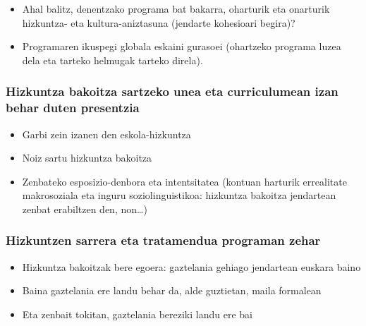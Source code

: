 \documentclass[
]{book}
\providecommand{\tightlist}{%
  \setlength{\itemsep}{0pt}\setlength{\parskip}{0pt}}
\begin{document}
\begin{itemize}
\tightlist
\item
  Ahal balitz, denentzako programa bat bakarra, oharturik eta onarturik hizkuntza- eta kultura-aniztasuna (jendarte kohesioari begira)?
\item
  Programaren ikuspegi globala eskaini gurasoei (ohartzeko programa luzea dela eta tarteko helmugak tarteko direla).
\end{itemize}

\hypertarget{hizkuntza-bakoitza-sartzeko-unea-eta-curriculumean-izan-behar-duten-presentzia}{%
\subsubsection*{Hizkuntza bakoitza sartzeko unea eta curriculumean izan behar duten presentzia}\label{hizkuntza-bakoitza-sartzeko-unea-eta-curriculumean-izan-behar-duten-presentzia}}

\begin{itemize}
\tightlist
\item
  Garbi zein izanen den eskola-hizkuntza
\item
  Noiz sartu hizkuntza bakoitza
\item
  Zenbateko esposizio-denbora eta intentsitatea (kontuan harturik errealitate makrosoziala eta inguru soziolinguistikoa: hizkuntza bakoitza jendartean zenbat erabiltzen den, non\ldots)
\end{itemize}

\hypertarget{hizkuntzen-sarrera-eta-tratamendua-programan-zehar}{%
\subsubsection*{Hizkuntzen sarrera eta tratamendua programan zehar}\label{hizkuntzen-sarrera-eta-tratamendua-programan-zehar}}

\begin{itemize}
\tightlist
\item
  Hizkuntza bakoitzak bere egoera: gaztelania gehiago jendartean euskara baino
\item
  Baina gaztelania ere landu behar da, alde guztietan, maila formalean
\item
  Eta zenbait tokitan, gaztelania bereziki landu ere bai
\end{itemize}
\end{document}
